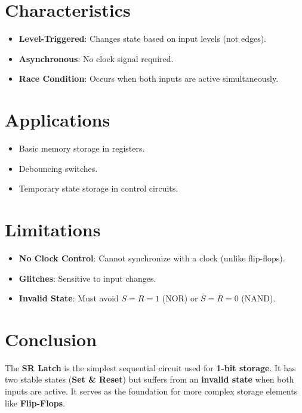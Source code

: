\documentclass{article}
\begin{document}
\section{Characteristics}
\begin{itemize}
    \item \textbf{Level-Triggered}: Changes state based on input levels (not edges).
    \item \textbf{Asynchronous}: No clock signal required.
    \item \textbf{Race Condition}: Occurs when both inputs are active simultaneously.
\end{itemize}

\section{Applications}
\begin{itemize}
    \item Basic memory storage in registers.
    \item Debouncing switches.
    \item Temporary state storage in control circuits.
\end{itemize}

\section{Limitations}
\begin{itemize}
    \item \textbf{No Clock Control}: Cannot synchronize with a clock (unlike flip-flops).
    \item \textbf{Glitches}: Sensitive to input changes.
    \item \textbf{Invalid State}: Must avoid \( S = R = 1 \) (NOR) or \( \overline{S} = \overline{R} = 0 \) (NAND).
\end{itemize}

\section{Conclusion}
The \textbf{SR Latch} is the simplest sequential circuit used for \textbf{1-bit storage}. It has two stable states (\textbf{Set \& Reset}) but suffers from an \textbf{invalid state} when both inputs are active. It serves as the foundation for more complex storage elements like \textbf{Flip-Flops}.
\end{document}
